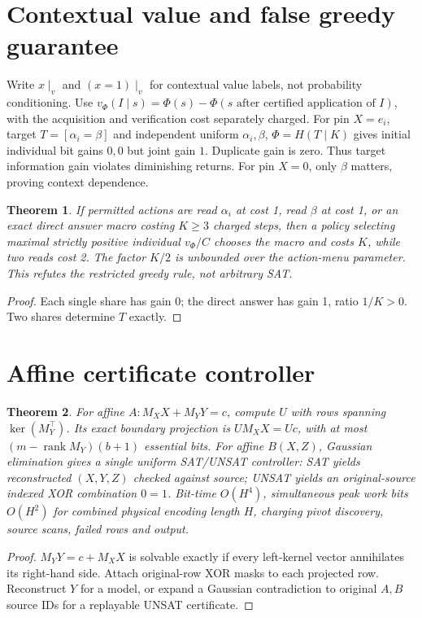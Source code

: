 \documentclass{article}
\newtheorem{theorem}{Theorem}
\begin{document}
\section{Contextual value and false greedy guarantee}
Write $x\mid_v$ and $(x=1)\mid_v$ for contextual value labels, not probability conditioning. Use $v_\Phi(I\mid s)=\Phi(s)-\Phi(s\text{ after certified application of }I)$, with the acquisition and verification cost separately charged. For pin $X=e_i$, target $T=[\alpha_i=\beta]$ and independent uniform $\alpha_i,\beta$, $\Phi=H(T\mid K)$ gives initial individual bit gains $0,0$ but joint gain $1$. Duplicate gain is zero. Thus target information gain violates diminishing returns. For pin $X=0$, only $\beta$ matters, proving context dependence.
\begin{theorem}
If permitted actions are read $\alpha_i$ at cost 1, read $\beta$ at cost 1, or an exact direct answer macro costing $K\ge3$ charged steps, then a policy selecting maximal \emph{strictly positive individual} $v_\Phi/C$ chooses the macro and costs $K$, while two reads cost 2. The factor $K/2$ is unbounded over the action-menu parameter. This refutes the restricted greedy rule, not arbitrary SAT.
\end{theorem}
\begin{proof}Each single share has gain 0; the direct answer has gain 1, ratio $1/K>0$. Two shares determine $T$ exactly.\end{proof}
\section{Affine certificate controller}
\begin{theorem}
For affine $A:M_X X+M_Y Y=c$, compute $U$ with rows spanning $\ker(M_Y^\top)$. Its exact boundary projection is $U M_X X=Uc$, with at most $(m-\operatorname{rank}M_Y)(b+1)$ essential bits. For affine $B(X,Z)$, Gaussian elimination gives a single uniform SAT/UNSAT controller: SAT yields reconstructed $(X,Y,Z)$ checked against source; UNSAT yields an original-source indexed XOR combination $0=1$. Bit-time $O(H^4)$, simultaneous peak work bits $O(H^2)$ for combined physical encoding length $H$, charging pivot discovery, source scans, failed rows and output.
\end{theorem}
\begin{proof}
$M_Y Y=c+M_X X$ is solvable exactly if every left-kernel vector annihilates its right-hand side. Attach original-row XOR masks to each projected row. Reconstruct $Y$ for a model, or expand a Gaussian contradiction to original $A,B$ source IDs for a replayable UNSAT certificate.
\end{proof}
\end{document}
